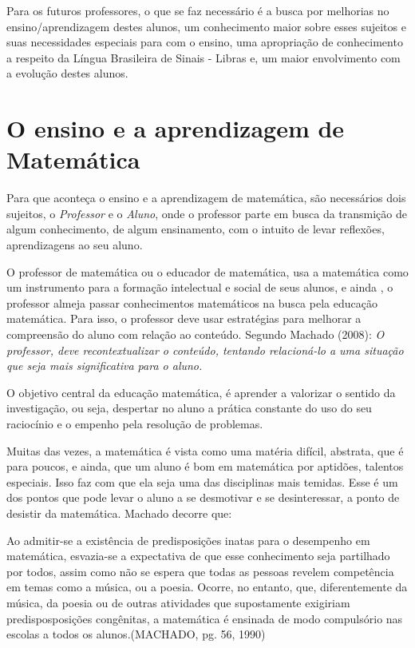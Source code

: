 \documentclass[brasil]{abnt}
\begin{document}
		Para os futuros professores, o que se faz necessário é a busca por melhorias no ensino/aprendizagem destes alunos, um conhecimento maior sobre esses sujeitos e suas necessidades especiais para com o ensino, 
		uma apropriação de conhecimento a respeito da Língua Brasileira de Sinais - Libras e, um maior envolvimento com a evolução destes alunos.  			     
	
		
		
\chapter{O ensino e a aprendizagem de Matemática}
    Para que aconteça o ensino e a aprendizagem de matemática, são necessários dois sujeitos, o \textit{Professor} e o \textit{Aluno}, onde o professor parte em busca da transmição de algum conhecimento, de algum 
    ensinamento, com o intuito de levar reflexões, aprendizagens ao seu aluno.
    
    O professor de matemática ou o educador de matemática, usa a matemática como um instrumento para a formação intelectual e social de seus alunos, e ainda , o professor almeja passar conhecimentos matemáticos
    na busca pela educação matemática. Para isso, o professor deve usar estratégias para melhorar a compreensão do aluno com relação ao conteúdo. Segundo Machado (2008): \textit{O professor, deve 
    recontextualizar o conteúdo, tentando relacioná-lo a uma situação que seja mais significativa para o aluno.}
    
    O objetivo central da educação matemática, é aprender a valorizar o sentido da investigação, ou seja, despertar no aluno a prática constante do uso do seu raciocínio e o empenho pela resolução de problemas.
     
    Muitas das vezes, a matemática é vista como uma matéria difícil, abstrata, que é para poucos, e ainda, que um aluno é bom em matemática por aptidões,
    talentos especiais. Isso faz com que ela seja uma das disciplinas mais temidas. Esse é um dos pontos que pode levar o aluno a se desmotivar e se desinteressar, a ponto de desistir da matemática. 
    Machado decorre que:
    
    \begin{citacao}Ao admitir-se a existência de predisposições inatas para o desempenho em matemática, esvazia-se a expectativa de que esse conhecimento seja
				partilhado por todos, assim como não se espera que todas as pessoas revelem competência em temas como a música, ou a poesia. Ocorre, no entanto,
				que, diferentemente da música, da poesia ou de outras atividades que supostamente exigiriam predisposposições congênitas, a matemática é ensinada de modo
				compulsório nas escolas a todos os alunos.(MACHADO, pg. 56, 1990)
	\end{citacao}
		 
\end{document}
